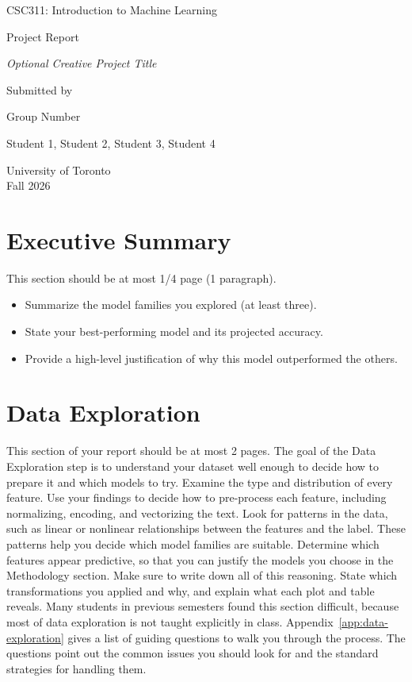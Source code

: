 \documentclass[12pt]{article}
\begin{document}
\begin{titlepage}
\centering
\vspace*{3cm}
{\Large {CSC311: Introduction to Machine Learning} \par}
\vspace{1cm}
{\Large {Project Report} \par}
\vspace{1cm}
{\large \textit{Optional Creative Project Title} \par}
\vspace{3cm}
{\large Submitted by \par}
\vspace{0.5cm}
{\large Group Number}
\vspace{0.5cm}
{\large Student 1, Student 2, Student 3, Student 4 \par}
\vfill
{\large University of Toronto \\ Fall 2026 \par}
\end{titlepage}
\clearpage
\setcounter{page}{1}
\section{Executive Summary}
This section should be at most 1/4 page (1 paragraph).
\begin{itemize}
\item Summarize the model families you explored (at least three).
\item State your best-performing model and its projected accuracy.
\item Provide a high-level justification of why this model outperformed the
others.
\end{itemize}
\section{Data Exploration}\label{sec:data-exploration}
This section of your report should be at most 2 pages.
The goal of the Data Exploration step is to understand your dataset well enough to
decide how to prepare it and which models to try.
Examine the type and distribution of every feature. Use your findings to decide how
to pre-process each feature, including normalizing, encoding, and vectorizing the
text.
Look for patterns in the data, such as linear or nonlinear relationships between
the features and the label. These patterns help you decide which model families are
suitable.
Determine which features appear predictive, so that you can justify the models you
choose in the Methodology section.
Make sure to write down all of this reasoning. State which transformations you
applied and why, and explain what each plot and table reveals.
Many students in previous semesters found this section difficult, because most of
data exploration is not taught explicitly in class. Appendix~\ref{app:data-
exploration} gives a list of guiding questions to walk you through the process. The
questions point out the common issues you should look for and the standard
strategies for handling them.
\end{document}
